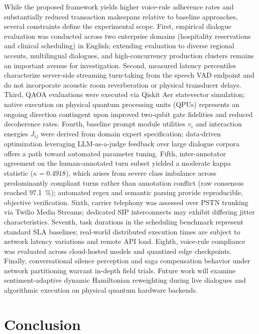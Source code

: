 \documentclass[review,12pt,times,authoryear]{elsarticle}
\theoremstyle{definition}
\begin{document}
While the proposed framework yields higher voice-rule adherence rates and substantially reduced transaction makespans relative to baseline approaches, several constraints define the experimental scope. First, empirical dialogue evaluation was conducted across two enterprise domains (hospitality reservations and clinical scheduling) in English; extending evaluation to diverse regional accents, multilingual dialogues, and high-concurrency production clusters remains an important avenue for investigation. Second, measured latency percentiles characterize server-side streaming turn-taking from the speech VAD endpoint and do not incorporate acoustic room reverberation or physical transducer delays. Third, QAOA evaluations were executed via Qiskit Aer statevector simulation; native execution on physical quantum processing units (QPUs) represents an ongoing direction contingent upon improved two-qubit gate fidelities and reduced decoherence rates. Fourth, baseline prompt module utilities $v_i$ and interaction energies $J_{ij}$ were derived from domain expert specification; data-driven optimization leveraging LLM-as-a-judge feedback over large dialogue corpora offers a path toward automated parameter tuning. Fifth, inter-annotator agreement on the human-annotated turn subset yielded a moderate kappa statistic ($\kappa = 0.4918$), which arises from severe class imbalance across predominantly compliant turns rather than annotation conflict (raw consensus reached \SI{97.1}{\percent}); automated regex and semantic parsing provide reproducible, objective verification. Sixth, carrier telephony was assessed over PSTN trunking via Twilio Media Streams; dedicated SIP interconnects may exhibit differing jitter characteristics. Seventh, task durations in the scheduling benchmark represent standard SLA baselines; real-world distributed execution times are subject to network latency variations and remote API load. Eighth, voice-rule compliance was evaluated across cloud-hosted models and quantized edge checkpoints. Finally, conversational silence perception and saga compensation behavior under network partitioning warrant in-depth field trials. Future work will examine sentiment-adaptive dynamic Hamiltonian reweighting during live dialogues and algorithmic execution on physical quantum hardware backends.

\section{Conclusion}
\label{sec:conclusion}
\end{document}
